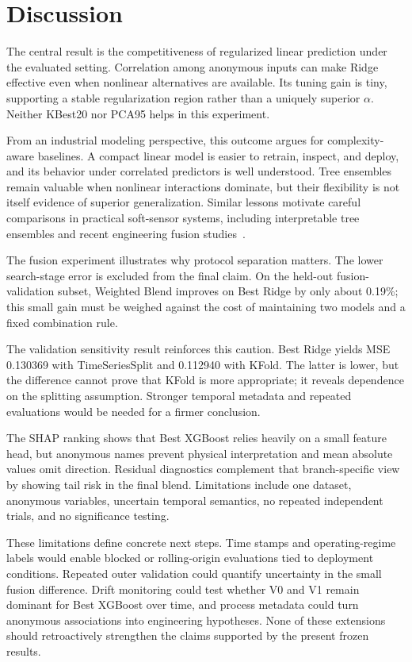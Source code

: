 \documentclass[sigconf,screen,review,anonymous]{acmart}
\begin{document}
\section{Discussion}
The central result is the competitiveness of regularized linear prediction under the evaluated setting. Correlation among anonymous inputs can make Ridge effective even when nonlinear alternatives are available. Its tuning gain is tiny, supporting a stable regularization region rather than a uniquely superior $\alpha$. Neither KBest20 nor PCA95 helps in this experiment.

From an industrial modeling perspective, this outcome argues for complexity-aware baselines. A compact linear model is easier to retrain, inspect, and deploy, and its behavior under correlated predictors is well understood. Tree ensembles remain valuable when nonlinear interactions dominate, but their flexibility is not itself evidence of superior generalization. Similar lessons motivate careful comparisons in practical soft-sensor systems, including interpretable tree ensembles and recent engineering fusion studies~\cite{cao2023interpretable_softsensor,chen2023zju_xgboost_shap,hu2025zju_stacking}.

The fusion experiment illustrates why protocol separation matters. The lower search-stage error is excluded from the final claim. On the held-out fusion-validation subset, Weighted Blend improves on Best Ridge by only about 0.19\%; this small gain must be weighed against the cost of maintaining two models and a fixed combination rule.


The validation sensitivity result reinforces this caution. Best Ridge yields MSE 0.130369 with TimeSeriesSplit and 0.112940 with KFold. The latter is lower, but the difference cannot prove that KFold is more appropriate; it reveals dependence on the splitting assumption. Stronger temporal metadata and repeated evaluations would be needed for a firmer conclusion.

The SHAP ranking shows that Best XGBoost relies heavily on a small feature head, but anonymous names prevent physical interpretation and mean absolute values omit direction. Residual diagnostics complement that branch-specific view by showing tail risk in the final blend. Limitations include one dataset, anonymous variables, uncertain temporal semantics, no repeated independent trials, and no significance testing.

These limitations define concrete next steps. Time stamps and operating-regime labels would enable blocked or rolling-origin evaluations tied to deployment conditions. Repeated outer validation could quantify uncertainty in the small fusion difference. Drift monitoring could test whether V0 and V1 remain dominant for Best XGBoost over time, and process metadata could turn anonymous associations into engineering hypotheses. None of these extensions should retroactively strengthen the claims supported by the present frozen results.
\end{document}
